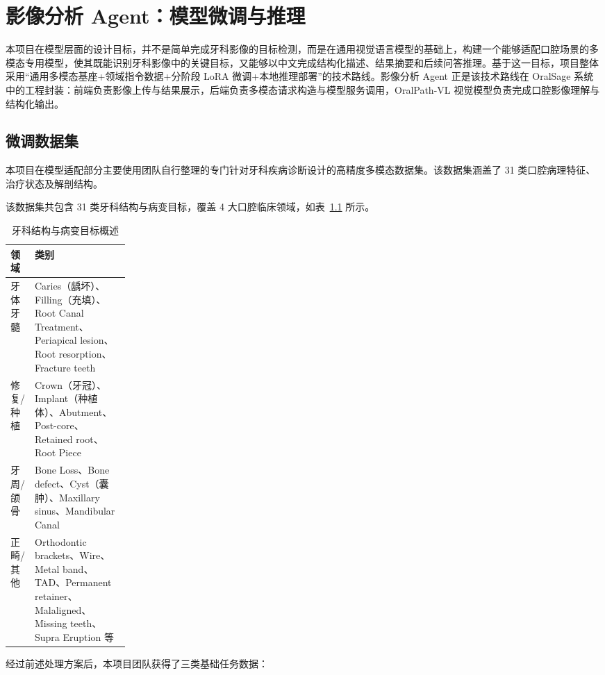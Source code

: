 
\chapter{影像分析 Agent：模型微调与推理}
\label{sec:image-analysis-agent}

本项目在模型层面的设计目标，并不是简单完成牙科影像的目标检测，而是在通用视觉语言模型的基础上，构建一个能够适配口腔场景的多模态专用模型，使其既能识别牙科影像中的关键目标，又能够以中文完成结构化描述、结果摘要和后续问答推理。基于这一目标，项目整体采用“通用多模态基座+领域指令数据+分阶段 LoRA 微调+本地推理部署”的技术路线。影像分析 Agent 正是该技术路线在 OralSage 系统中的工程封装：前端负责影像上传与结果展示，后端负责多模态请求构造与模型服务调用，OralPath-VL 视觉模型负责完成口腔影像理解与结构化输出。

\section{微调数据集}

本项目在模型适配部分主要使用团队自行整理的专门针对牙科疾病诊断设计的高精度多模态数据集。该数据集涵盖了 31 类口腔病理特征、治疗状态及解剖结构。

该数据集共包含 31 类牙科结构与病变目标，覆盖 4 大口腔临床领域，如表~\ref{tab:oralpath-target-overview} 所示。

\begin{table}[H]
  \centering
  \caption{牙科结构与病变目标概述}
  \label{tab:oralpath-target-overview}
  \small
  \renewcommand{\arraystretch}{1.18}
  \begin{tabularx}{\linewidth}{p{0.20\linewidth}X}
    \toprule
    领域 & 类别 \\
    \midrule
    牙体牙髓 & Caries（龋坏）、Filling（充填）、Root Canal Treatment、Periapical lesion、Root resorption、Fracture teeth \\
    修复/种植 & Crown（牙冠）、Implant（种植体）、Abutment、Post-core、Retained root、Root Piece \\
    牙周/颌骨 & Bone Loss、Bone defect、Cyst（囊肿）、Maxillary sinus、Mandibular Canal \\
    正畸/其他 & Orthodontic brackets、Wire、Metal band、TAD、Permanent retainer、Malaligned、Missing teeth、Supra Eruption 等 \\
    \bottomrule
  \end{tabularx}
\end{table}

经过前述处理方案后，本项目团队获得了三类基础任务数据：

